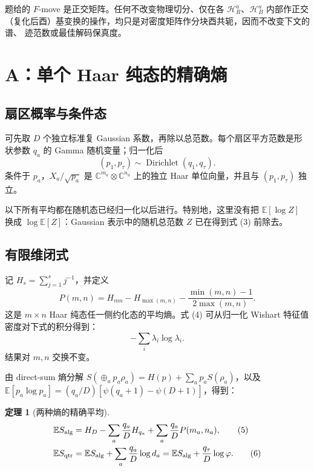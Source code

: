 \documentclass[UTF8,11pt,a4paper]{ctexart}
\newtheorem{theorem}{定理}[section]
\theoremstyle{definition}
\newcommand{\E}{\mathbb E}
\newcommand{\cH}{\mathcal H}
\newcommand{\phiG}{\varphi}
\begin{document}
题给的 $F$-move 是正交矩阵。任何不改变物理切分、仅在各 $\cH_R^a$、$\cH_B^a$
内部作正交（复化后酉）基变换的操作，均只是对密度矩阵作分块酉共轭，因而不改变下文的谱、
迹范数或最佳解码保真度。

\section{A：单个 Haar 纯态的精确熵}

\subsection{扇区概率与条件态}

可先取 $D$ 个独立标准复 Gaussian 系数，再除以总范数。每个扇区平方范数是形状参数
$q_a$ 的 Gamma 随机变量；归一化后
\begin{equation}
(p_1,p_\tau)\sim\operatorname{Dirichlet}(q_1,q_\tau).     \tag{3}
\end{equation}
条件于 $p_a$，$X_a/\sqrt{p_a}$ 是 $\mathbb C^{m_a}\otimes\mathbb C^{n_a}$
上的独立 Haar 单位向量，并且与 $(p_1,p_\tau)$ 独立。

以下所有平均都在随机态已经归一化以后进行。特别地，这里没有把
$\E[\log Z]$ 换成 $\log\E[Z]$：Gaussian 表示中的随机总范数 $Z$ 已在得到式 (3) 前除去。

\subsection{有限维闭式}

记 $H_s=\sum_{j=1}^s j^{-1}$，并定义
\begin{equation}
P(m,n)=H_{mn}-H_{\max(m,n)}-
\frac{\min(m,n)-1}{2\max(m,n)}.                           \tag{4}
\end{equation}
这是 $m\times n$ Haar 纯态任一侧约化态的平均熵。式 (4) 可从归一化 Wishart
特征值密度对下式的积分得到：
\[
-\sum_i\lambda_i\log\lambda_i.
\]
结果对 $m,n$ 交换不变。

由 direct-sum 熵分解
$S(\oplus_a p_a\rho_a)=H(p)+\sum_a p_aS(\rho_a)$，以及
$\E[p_a\log p_a]=(q_a/D)[\psi(q_a+1)-\psi(D+1)]$，得到：

\begin{theorem}[两种熵的精确平均]
\begin{align}
\E S_{\rm alg}
 &=H_D-\sum_a\frac{q_a}{D}H_{q_a}
   +\sum_a\frac{q_a}{D}P(m_a,n_a),                       \tag{5}\\
\E S_{\rm qtr}
 &=\E S_{\rm alg}+\sum_a\frac{q_a}{D}\log d_a
 =\E S_{\rm alg}+\frac{q_\tau}{D}\log\phiG.           \tag{6}
\end{align}
\end{theorem}
\end{document}
